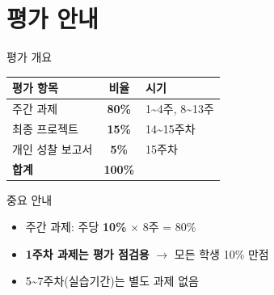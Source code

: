 \documentclass[aspectratio=169, 11pt]{beamer}
\begin{document}
\section{평가 안내}

\begin{frame}{평가 개요}
\begin{table}
\centering
\begin{tabular}{l c l}
\toprule
\textbf{평가 항목} & \textbf{비율} & \textbf{시기} \\
\midrule
주간 과제 & \textbf{80\%} & 1\textasciitilde4주, 8\textasciitilde13주 \\
최종 프로젝트 & \textbf{15\%} & 14\textasciitilde15주차 \\
개인 성찰 보고서 & \textbf{5\%} & 15주차 \\
\midrule
\textbf{합계} & \textbf{100\%} & \\
\bottomrule
\end{tabular}
\end{table}

\vspace{1em}

\begin{alertblock}{중요 안내}
\begin{itemize}
    \item 주간 과제: 주당 \textbf{10\%} × 8주 = 80\%
    \item \textbf{1주차 과제는 평가 점검용} $\rightarrow$ 모든 학생 10\% 만점
    \item 5\textasciitilde7주차(실습기간)는 별도 과제 없음
\end{itemize}
\end{alertblock}
\end{frame}
\end{document}
